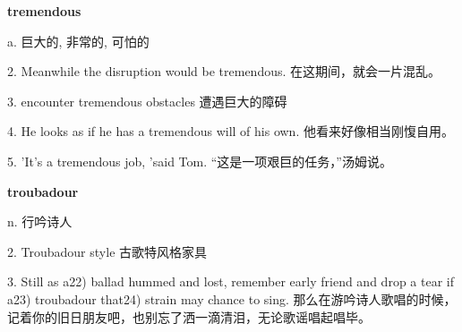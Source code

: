 \documentclass[12pt]{book}
\begin{document}
\textbf{tremendous}

a. 巨大的, 非常的, 可怕的

2.  Meanwhile the disruption would be tremendous.  在这期间，就会一片混乱。 


3.  encounter tremendous obstacles  遭遇巨大的障碍 


4.  He looks as if he has a tremendous will of his own.  他看来好像相当刚愎自用。 


5.  'It's a tremendous job, 'said Tom.  “这是一项艰巨的任务，”汤姆说。 


\vspace{12pt}

\textbf{troubadour}

n. 行吟诗人

2.  Troubadour style  古歌特风格家具 


3.  Still as a22) ballad hummed and lost, remember early friend and drop a tear if a23) troubadour that24) strain may chance to sing.  那么在游吟诗人歌唱的时候，记着你的旧日朋友吧，也别忘了洒一滴清泪，无论歌谣唱起唱毕。 


\vspace{12pt}
\end{document}

